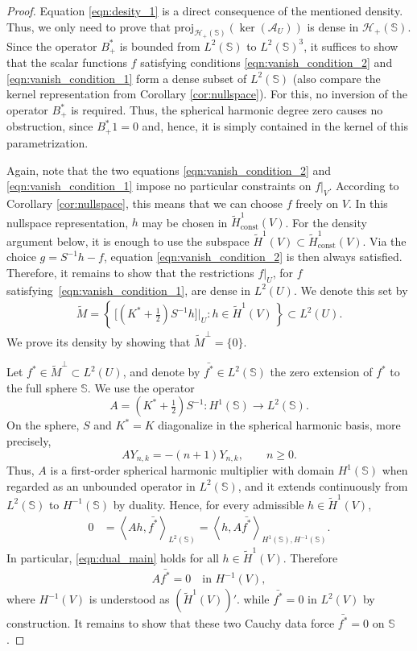 \documentclass[a4paper, 11pt]{article}
\renewcommand{\SS}{\mathbb{S}}
\begin{document}
\begin{proof}
Equation \eqref{eqn:desity_1} is a direct consequence of the mentioned density. Thus, we only need to prove that $\mathrm{proj}_{\mathcal H_+(\SS)}(\ker(\mathcal A_{U}))$ is dense in $\mathcal H_+(\SS)$. Since the operator $B_+^{\ast}$ is bounded from $L^2(\SS)$ to $L^2(\SS)^3$, it suffices to show that the scalar functions $f$ satisfying conditions \eqref{eqn:vanish_condition_2} and \eqref{eqn:vanish_condition_1} form a dense subset of $L^2(\SS)$ (also compare the kernel representation from Corollary \ref{cor:nullspace}). For this, no inversion of the operator $B_+^*$ is required. Thus, the spherical harmonic degree zero causes no obstruction, since $B_+^\ast 1=0$ and, hence, it is simply contained in the kernel of this parametrization.

Again, note that the two equations \eqref{eqn:vanish_condition_2} and \eqref{eqn:vanish_condition_1} impose no particular constraints on $f|_{V}$. According to Corollary \ref{cor:nullspace}, this means that we can choose $f$ freely on $V$. In this nullspace representation, $h$ may be chosen in $\widetilde H^1_{\mathrm{const}}(V)$. For the density argument below, it is enough to use the subspace $\widetilde H^1(V)\subset\widetilde H^1_{\mathrm{const}}(V)$. Via the choice $g=S^{-1}h-f$, equation \eqref{eqn:vanish_condition_2} is then always satisfied. Therefore, it remains to show that the restrictions $f|_{U}$, for $f$ satisfying~\eqref{eqn:vanish_condition_1}, are dense in $L^2(U)$. We denote this set by 
\begin{align}
    \tilde{M}=\left\{\, \big[(K^{\ast}+\tfrac{1}{2})S^{-1}h\big]\big|_{U} : h\in \widetilde H^1(V)\, \right\}\subset L^2(U).
\end{align}
We prove its density by showing that $\tilde{M}^{\perp}=\{0\}$. 

Let $f^{\ast}\in \tilde{M}^{\perp} \subset L^2(U)$, and denote by $\bar{f^{\ast}}\in L^2(\SS)$ the zero extension of $f^{\ast}$ to the full sphere $\SS$. We use the operator
\[
	A=(K^\ast+\tfrac12)S^{-1}:H^1(\SS)\longrightarrow L^2(\SS).
\]
On the sphere, $S$ and $K^\ast=K$ diagonalize in the spherical harmonic basis, more precisely,
\[
	A Y_{n,k}=-(n+1)Y_{n,k},\qquad n\ge0.
\]
Thus, $A$ is a first-order spherical harmonic multiplier with domain $H^1(\SS)$ when regarded as an unbounded operator in $L^2(\SS)$, and it extends continuously from $L^2(\SS)$ to $H^{-1}(\SS)$ by duality. Hence, for every admissible $h\in \widetilde H^1(V)$,
\begin{align}
    0&=\left\langle Ah, \bar{f^{\ast}}\right\rangle_{L^2(\SS)}
    =\left\langle h, A\bar{f^{\ast}} \right\rangle_{H^1(\SS),H^{-1}(\SS)}. \label{eqn:dual_main}
\end{align}
In particular, \eqref{eqn:dual_main} holds for all $h\in \widetilde H^1(V)$. Therefore
\begin{align}
	A\bar{f^{\ast}}=0 \quad \text{in } H^{-1}(V),\label{eqn:Afzerosobolev}
\end{align}
where $H^{-1}(V)$ is understood as $(\widetilde H^1(V))'$. while $\bar{f^{\ast}}=0$ in $L^2(V)$ by construction. It remains to show that these two Cauchy data force $\bar{f^{\ast}}=0$ on $\SS$.


\end{proof}
\end{document}
